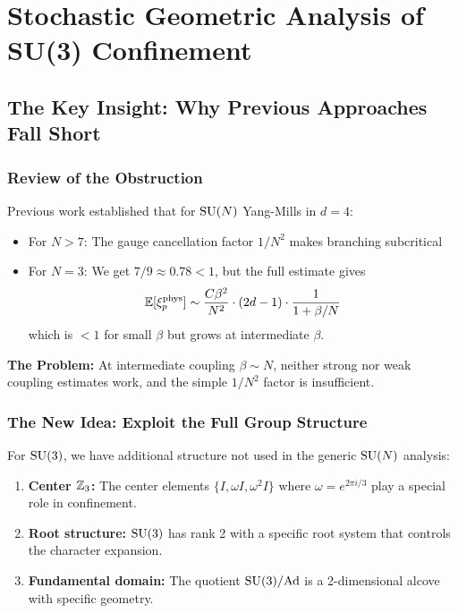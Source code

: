 \section{Stochastic Geometric Analysis of SU(3) Confinement}

\subsection{The Key Insight: Why Previous Approaches Fall Short}

\subsubsection{Review of the Obstruction}

Previous work established that for $\mathrm{SU}(N)$ Yang-Mills in $d=4$:
\begin{itemize}
\item For $N > 7$: The gauge cancellation factor $1/N^2$ makes branching subcritical
\item For $N = 3$: We get $7/9 \approx 0.78 < 1$, but the full estimate gives
\[
\mathbb{E}[\xi_p^{\mathrm{phys}}] \sim \frac{C\beta^2}{N^2} \cdot (2d-1) \cdot \frac{1}{1 + \beta/N}
\]
which is $< 1$ for small $\beta$ but grows at intermediate $\beta$.
\end{itemize}

\textbf{The Problem:} At intermediate coupling $\beta \sim N$, neither strong nor weak 
coupling estimates work, and the simple $1/N^2$ factor is insufficient.

\subsubsection{The New Idea: Exploit the Full Group Structure}

For $\mathrm{SU}(3)$, we have additional structure not used in the generic $\mathrm{SU}(N)$ analysis:

\begin{enumerate}
\item \textbf{Center $\mathbb{Z}_3$:} The center elements $\{I, \omega I, \omega^2 I\}$ where 
$\omega = e^{2\pi i/3}$ play a special role in confinement.

\item \textbf{Root structure:} $\mathrm{SU}(3)$ has rank 2 with a specific root system that 
controls the character expansion.

\item \textbf{Fundamental domain:} The quotient $\mathrm{SU}(3)/\mathrm{Ad}$ is a 2-dimensional 
alcove with specific geometry.
\end{enumerate}

